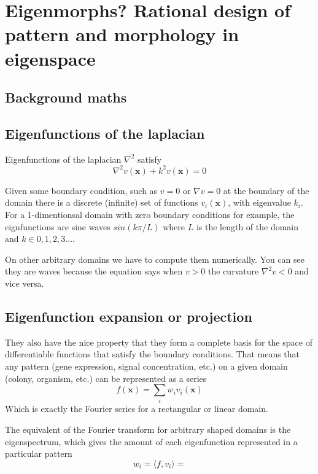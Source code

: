 \documentclass{report}
\renewcommand{\vec}[1]{\mathbf{#1}}
\begin{document}
 

\chapter{Eigenmorphs? Rational design of pattern and morphology in eigenspace}

\section{Background maths}
\section{Eigenfunctions of the laplacian}
Eigenfunctions of the laplacian $\nabla^2$ satisfy
\begin{equation}
\nabla^2 v(\vec{x}) + k^2 v(\vec{x}) = 0
\end{equation}

Given some boundary condition, such as $v=0$ or $\nabla v=0$ at the boundary of the
domain there is a discrete (infinite) set of functions $v_i(\vec{x})$, with
eigenvalue $k_i$.  For a 1-dimentionsal domain with zero boundary
conditions for example, the eignfunctions are sine waves $sin(k\pi/L)$ where
$L$ is the length of the domain and $k \in {0,1,2,3...}$.

On other arbitrary domains we have to compute them numerically. You can see they
are waves because the equation says when $v>0$ the curvature $\nabla^2v<0$ and
vice versa.

\section{Eigenfunction expansion or projection}
They also have the nice property that they form a complete basis for the space
of differentiable functions that satisfy the boundary conditions. That means that
any pattern (gene expression, signal concentration, etc.) on a given domain
(colony, organism, etc.) can be represented as a series
\begin{equation}
f(\vec{x}) = \sum_{i} w_i v_i(\vec{x})
\end{equation}
Which is exactly the Fourier series for a rectangular or linear domain.

The equivalent of the Fourier transform for arbitrary shaped domains is the
eigenspectrum, which gives the amount of each eigenfunction represented in a
particular pattern
\begin{equation}
w_i = \langle f, v_i \rangle = 
\end{equation}
\end{document}
